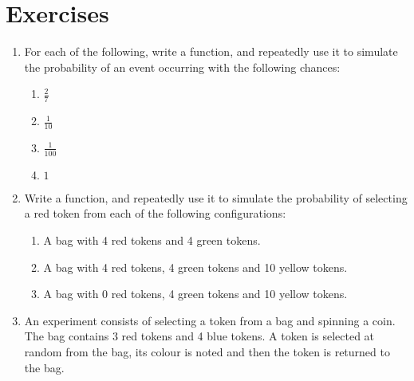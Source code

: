 \section{Exercises}
\label{\detokenize{tools-for-mathematics/06-probability/exercises/main:exercises}}\label{\detokenize{tools-for-mathematics/06-probability/exercises/main::doc}}

\begin{enumerate}

\item 

For each of the following, write a function, and repeatedly use it to simulate
the probability of an event occurring with the following chances:
\begin{enumerate}

\item 

\(\frac{2}{7}\)

\item 

\(\frac{1}{10}\)

\item 

\(\frac{1}{100}\)

\item 

\(1\)

\end{enumerate}

\item 

Write a function, and repeatedly use it to simulate the probability of
selecting a red token from each of the following configurations:
\begin{enumerate}

\item 

A bag with 4 red tokens and 4 green tokens.

\item 

A bag with 4 red tokens, 4 green tokens and 10 yellow tokens.

\item 

A bag with 0 red tokens, 4 green tokens and 10 yellow tokens.

\end{enumerate}

\item 

An experiment consists of selecting a token from a bag and spinning a coin. The bag contains 3 red tokens and 4 blue tokens. A token is selected at random from the bag, its colour is noted and then the token is returned to the bag.



\end{enumerate}
